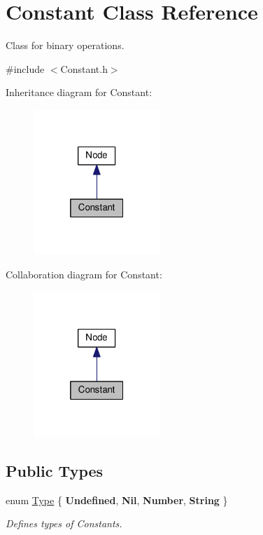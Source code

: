 \hypertarget{classConstant}{}\section{Constant Class Reference}
\label{classConstant}


Class for binary operations.  




{\ttfamily \#include $<$Constant.\+h$>$}



Inheritance diagram for Constant\+:
\nopagebreak
\begin{figure}[H]
\begin{center}
\leavevmode
\includegraphics[width=136pt]{classConstant__inherit__graph}
\end{center}
\end{figure}


Collaboration diagram for Constant\+:
\nopagebreak
\begin{figure}[H]
\begin{center}
\leavevmode
\includegraphics[width=136pt]{classConstant__coll__graph}
\end{center}
\end{figure}
\subsection*{Public Types}
\begin{DoxyCompactItemize}
\item 
\hypertarget{classConstant_aae1f2765a3f050013d5ab334de3b5985}{}enum \hyperlink{classConstant_aae1f2765a3f050013d5ab334de3b5985}{Type} \{ {\bfseries Undefined}, 
{\bfseries Nil}, 
{\bfseries Number}, 
{\bfseries String}
 \}\label{classConstant_aae1f2765a3f050013d5ab334de3b5985}

\begin{DoxyCompactList}\small\item\em Defines types of Constants. \end{DoxyCompactList}\end{DoxyCompactItemize}
